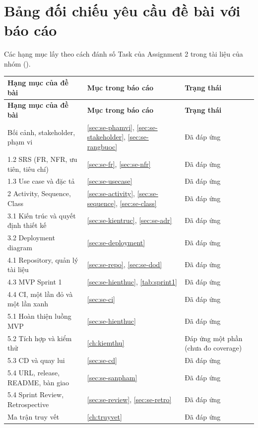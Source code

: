 \chapter{Bảng đối chiếu yêu cầu đề bài với báo cáo}\label{app:doichieu}
Các hạng mục lấy theo cách đánh số Task của Assignment 2 trong tài liệu của nhóm ().
\begin{longtable}{@{}p{5.6cm}p{4.2cm}p{3.6cm}@{}}
\toprule
\textbf{Hạng mục của đề bài} & \textbf{Mục trong báo cáo} & \textbf{Trạng thái} \\ \midrule \endfirsthead
\toprule
\textbf{Hạng mục của đề bài} & \textbf{Mục trong báo cáo} & \textbf{Trạng thái} \\ \midrule \endhead
\bottomrule \endlastfoot
1.1 Bối cảnh, stakeholder, phạm vi & \cref{sec:se-phamvi}, \cref{sec:se-stakeholder}, \cref{sec:se-rangbuoc} & Đã đáp ứng \\
1.2 SRS (FR, NFR, ưu tiên, tiêu chí) & \cref{sec:se-fr}, \cref{sec:se-nfr} & Đã đáp ứng \\
1.3 Use case và đặc tả & \cref{sec:se-usecase} & Đã đáp ứng \\
2 Activity, Sequence, Class & \cref{sec:se-activity}, \cref{sec:se-sequence}, \cref{sec:se-class} & Đã đáp ứng \\
3.1 Kiến trúc và quyết định thiết kế & \cref{sec:se-kientruc}, \cref{sec:se-adr} & Đã đáp ứng \\
3.2 Deployment diagram & \cref{sec:se-deployment} & Đã đáp ứng \\
4.1 Repository, quản lý tài liệu & \cref{sec:se-repo}, \cref{sec:se-dod} & Đã đáp ứng \\
4.3 MVP Sprint 1 & \cref{sec:se-hienthuc}, \cref{tab:sprint1} & Đã đáp ứng \\
4.4 CI, một lần đỏ và một lần xanh & \cref{sec:se-ci} & Đã đáp ứng \\
5.1 Hoàn thiện luồng MVP & \cref{sec:se-hienthuc} & Đã đáp ứng \\
5.2 Tích hợp và kiểm thử & \cref{ch:kiemthu} & Đáp ứng một phần (chưa đo coverage) \\
5.3 CD và quay lui & \cref{sec:se-cd} & Đã đáp ứng \\
5.4 URL, release, README, bàn giao & \cref{sec:se-sanpham} & Đã đáp ứng \\
5.4 Sprint Review, Retrospective & \cref{sec:se-review}, \cref{sec:se-retro} & Đã đáp ứng \\
Ma trận truy vết & \cref{ch:truyvet} & Đã đáp ứng \\
\end{longtable}
